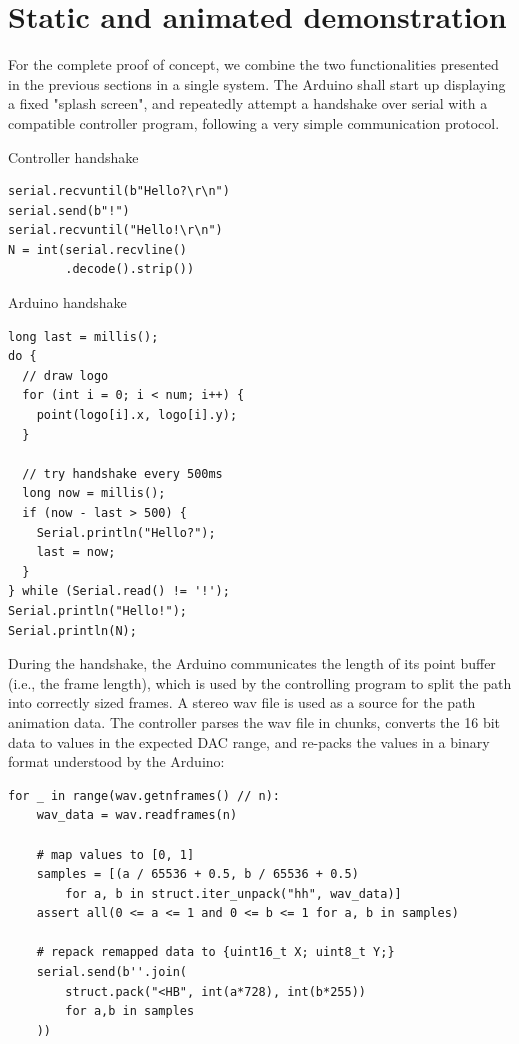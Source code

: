 \documentclass[12pt]{article}
\begin{document}
\section{Static and animated demonstration}

For the complete proof of concept, we combine the two functionalities presented in the previous sections in a single system. The Arduino shall start up displaying a fixed "splash screen", and repeatedly attempt a handshake over serial with a compatible controller program, following a very simple communication protocol.

\begin{multicols}{2}

\noindent Controller handshake

\begin{lstlisting}
serial.recvuntil(b"Hello?\r\n")
serial.send(b"!")
serial.recvuntil("Hello!\r\n")
N = int(serial.recvline()
        .decode().strip())
\end{lstlisting}

\columnbreak

\noindent Arduino handshake

\begin{lstlisting}
long last = millis();
do {
  // draw logo
  for (int i = 0; i < num; i++) {
    point(logo[i].x, logo[i].y);
  }
  
  // try handshake every 500ms
  long now = millis();
  if (now - last > 500) {
    Serial.println("Hello?");
    last = now;
  }
} while (Serial.read() != '!');
Serial.println("Hello!");
Serial.println(N);
\end{lstlisting}

\end{multicols}

During the handshake, the Arduino communicates the length of its point buffer (i.e., the frame length), which is used by the controlling program to split the path into correctly sized frames. A stereo wav file is used as a source for the path animation data. The controller parses the wav file in chunks, converts the 16 bit data to values in the expected DAC range, and re-packs the values in a binary format understood by the Arduino:

\begin{lstlisting}
for _ in range(wav.getnframes() // n):
    wav_data = wav.readframes(n)
    
    # map values to [0, 1]
    samples = [(a / 65536 + 0.5, b / 65536 + 0.5)
        for a, b in struct.iter_unpack("hh", wav_data)]
    assert all(0 <= a <= 1 and 0 <= b <= 1 for a, b in samples)

	# repack remapped data to {uint16_t X; uint8_t Y;} 
    serial.send(b''.join(
        struct.pack("<HB", int(a*728), int(b*255))
        for a,b in samples
    ))
\end{lstlisting}
\end{document}

